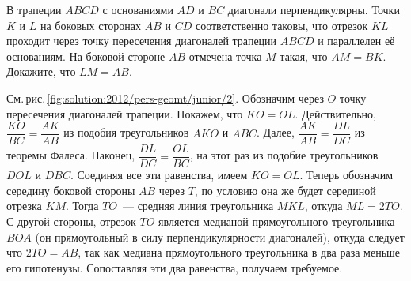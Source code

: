 В трапеции $ABCD$ с основаниями $AD$ и $BC$ диагонали перпендикулярны.
Точки $K$ и $L$ на боковых сторонах $AB$ и $CD$ соответственно таковы, что
отрезок $KL$ проходит через точку пересечения диагоналей трапеции $ABCD$ и
параллелен её основаниям.
На боковой стороне $AB$ отмечена точка $M$ такая, что $AM = BK$.
Докажите, что $LM = AB$.

%
\label{solution:2012/pers-geomt/junior/2}%
См.\,рис.\,\ref{fig:solution:2012/pers-geomt/junior/2}.
Обозначим через $O$ точку пересечения диагоналей трапеции.
Покажем, что $KO = OL$.
Действительно, $\dfrac{KO}{BC} = \dfrac{AK}{AB}$ из подобия треугольников
$AKO$ и $ABC$.
Далее, $\dfrac{AK}{AB} = \dfrac{DL}{DC}$ из теоремы Фалеса.
Наконец, $\dfrac{DL}{DC} = \dfrac{OL}{BC}$, на этот раз из подобие
треугольников $DOL$ и $DBC$.
Соединяя все эти равенства, имеем $KO = OL$.
Теперь обозначим середину боковой стороны $AB$ через $T$, по условию она же
будет серединой отрезка $KM$.
Тогда $TO$~--- средняя линия треугольника $MKL$, откуда $ML = 2 TO$.
С другой стороны, отрезок $TO$ является медианой прямоугольного треугольника
$BOA$
(он прямоугольный в силу перпендикулярности диагоналей),
откуда следует что $2 TO = AB$, так как медиана прямоугольного треугольника в
два раза меньше его гипотенузы.
Сопоставляя эти два равенства, получаем требуемое.

